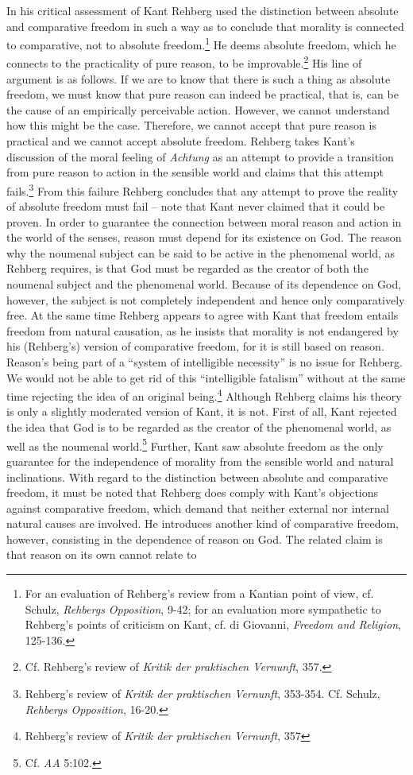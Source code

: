 In his critical assessment of Kant Rehberg used the distinction between absolute and comparative freedom in such a way as to conclude that morality is connected to comparative, not to absolute freedom.\footnote{ For an evaluation of Rehberg's review from a Kantian point of view, cf. Schulz, \textit{Rehbergs Opposition}, 9{-}42; for an evaluation more sympathetic to Rehberg's points of criticism on Kant, cf. di Giovanni, \textit{Freedom and Religion}, 125{-}136. } He deems absolute freedom, which he connects to the practicality of pure reason, to be improvable.\footnote{ Cf. Rehberg's review of \textit{Kritik der praktischen Vernunft}, 357. } His line of argument is as follows. If we are to know that there is such a thing as absolute freedom, we must know that pure reason can indeed be practical, that is, can be the cause of an empirically perceivable action. However, we cannot understand how this might be the case. Therefore, we cannot accept that pure reason is practical and we cannot accept absolute freedom. Rehberg takes Kant's discussion of the moral feeling of \textit{Achtung} as an attempt to provide a transition from pure reason to action in the sensible world and claims that this attempt fails.\footnote{ Rehberg's review of \textit{Kritik der praktischen Vernunft}, 353{-}354. Cf. Schulz, \textit{Rehbergs Opposition}, 16{-}20.} From this failure Rehberg concludes that any attempt to prove the reality of absolute freedom must fail {--} note that Kant never claimed that it could be proven. In order to guarantee the connection between moral reason and action in the world of the senses, reason must depend for its existence on God. The reason why the noumenal subject can be said to be active in the phenomenal world, as Rehberg requires, is that God must be regarded as the creator of both the noumenal subject and the phenomenal world. Because of its dependence on God, however, the subject is not completely independent and hence only comparatively free. At the same time Rehberg appears to agree with Kant that freedom entails freedom from natural causation, as he insists that morality is not endangered by his (Rehberg's) version of comparative freedom, for it is still based on reason. Reason's being part of a ``system of intelligible necessity'' is no issue for Rehberg. We would not be able to get rid of this ``intelligible fatalism'' without at the same time rejecting the idea of an original being.\footnote{ Rehberg's review of \textit{Kritik der praktischen Vernunft}, 357 } Although Rehberg claims his theory is only a slightly moderated version of Kant, it is not. First of all, Kant rejected the idea that God is to be regarded as the creator of the phenomenal world, as well as the noumenal world.\footnote{ Cf. \textit{AA} 5:102. } Further, Kant saw absolute freedom as the only guarantee for the independence of morality from the sensible world and natural inclinations. With regard to the distinction between absolute and comparative freedom, it must be noted that Rehberg does comply with Kant's objections against comparative freedom, which demand that neither external nor internal natural causes are involved. He introduces another kind of comparative freedom, however, consisting in the dependence of reason on God. The related claim is that reason on its own cannot relate to 